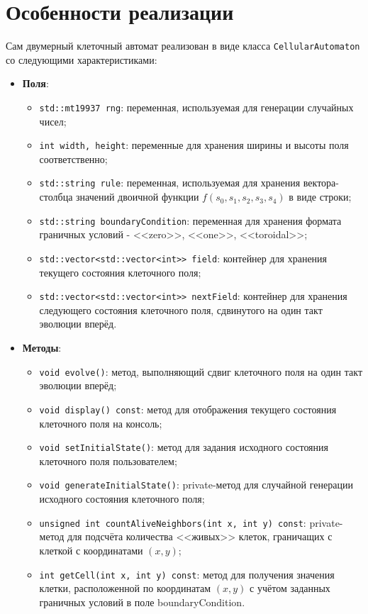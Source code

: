 \documentclass[a4paper, final]{article}
\begin{document}
\newpage
\section{Особенности реализации}
Сам двумерный клеточный автомат реализован в виде класса \texttt{CellularAutomaton} со следующими
характеристиками:
\begin{itemize}
  \item \textbf{Поля}:
  \begin{itemize}
    \item \texttt{std::mt19937 rng}: переменная, используемая для генерации случайных чисел;
    \item \texttt{int width, height}: переменные для хранения ширины и высоты поля соответственно;
    \item \texttt{std::string rule}: переменная, используемая для хранения вектора-столбца значений
    двоичной функции $f(s_0, s_1, s_2, s_3, s_4)$ в виде строки;
    \item \texttt{std::string boundaryCondition}: переменная для хранения формата граничных условий -
    <<zero>>, <<one>>, <<toroidal>>;
    \item \texttt{std::vector<std::vector<int>> field}: контейнер для хранения текущего состояния
    клеточного поля;
    \item \texttt{std::vector<std::vector<int>> nextField}: контейнер для хранения следующего
    состояния клеточного поля, сдвинутого на один такт эволюции вперёд.
  \end{itemize}
  
  \item \textbf{Методы}:
  \begin{itemize}
    \item \texttt{void evolve()}: метод, выполняющий сдвиг клеточного поля на один такт эволюции
    вперёд;
    \item \texttt{void display() const}: метод для отображения текущего состояния клеточного поля
    на консоль;
    \item \texttt{void setInitialState()}: метод для задания исходного состояния клеточного поля
    пользователем;
    \item \texttt{void generateInitialState()}: private-метод для случайной генерации исходного 
    состояния клеточного поля;
    \item \texttt{unsigned int countAliveNeighbors(int x, int y) const}: private-метод для подсчёта
    количества <<живых>> клеток, граничащих с клеткой с координатами $(x,  y)$;
    \item \texttt{int getCell(int x, int y) const}: метод для получения значения клетки, расположенной
    по координатам $(x, y)$ с учётом заданных граничных условий в поле boundaryCondition.
  \end{itemize}
\end{itemize}
\end{document}
